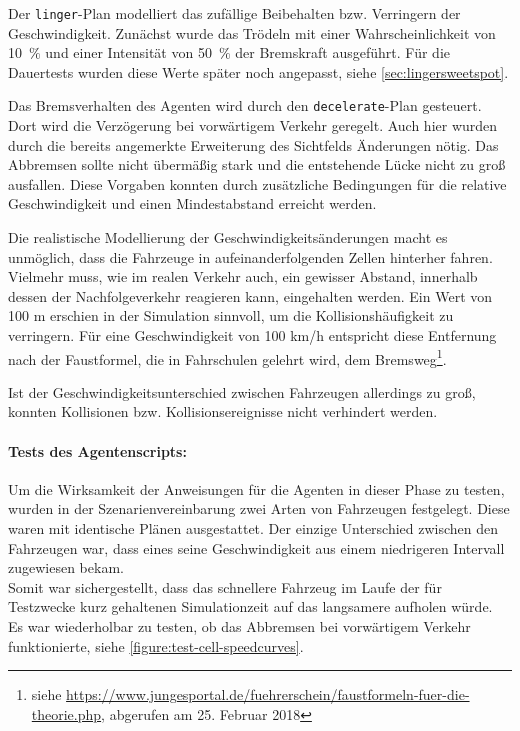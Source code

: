 Der \texttt{linger}-Plan modelliert das zufällige Beibehalten bzw. Verringern der Geschwindigkeit. 
Zunächst wurde das Trödeln mit einer Wahrscheinlichkeit von \mbox{10 $\%$} und einer Intensität von \mbox{50 $\%$} der Bremskraft ausgeführt.
Für die Dauertests wurden diese Werte später noch angepasst, siehe \cref{sec:lingersweetspot}.

Das Bremsverhalten des Agenten wird durch den \texttt{decelerate}-Plan gesteuert. 
Dort wird die Verzögerung bei vorwärtigem Verkehr geregelt.
Auch hier wurden durch die bereits angemerkte Erweiterung des Sichtfelds Änderungen nötig. 
Das Abbremsen sollte nicht übermäßig stark und die entstehende Lücke nicht zu groß ausfallen. 
Diese Vorgaben konnten durch zusätzliche Bedingungen für die relative Geschwindigkeit und einen Mindestabstand erreicht werden.

Die realistische Modellierung der Geschwindigkeitsänderungen macht es unmöglich, dass die Fahrzeuge in aufeinanderfolgenden Zellen hinterher fahren.
Vielmehr muss, wie im realen Verkehr auch, ein gewisser Abstand, innerhalb dessen der Nachfolgeverkehr reagieren kann, eingehalten werden.
Ein Wert von 100 m erschien in der Simulation sinnvoll, um die Kollisionshäufigkeit zu verringern. 
Für eine Geschwindigkeit von 100 km/h entspricht diese Entfernung nach der Faustformel, die in Fahrschulen gelehrt wird, dem Bremsweg\footnote{siehe \url{https://www.jungesportal.de/fuehrerschein/faustformeln-fuer-die-theorie.php}, abgerufen am 25. Februar 2018}.

Ist der Geschwindigkeitsunterschied zwischen Fahrzeugen allerdings zu groß, konnten Kollisionen bzw. Kollisionsereignisse nicht verhindert werden.

\paragraph*{Tests des Agentenscripts:}
Um die Wirksamkeit der Anweisungen für die Agenten in dieser Phase zu testen, wurden in der Szenarienvereinbarung zwei Arten von Fahrzeugen festgelegt.
Diese waren mit identische Plänen ausgestattet.
Der einzige Unterschied zwischen den Fahrzeugen war, dass eines seine Geschwindigkeit aus einem niedrigeren Intervall zugewiesen bekam.
\\
Somit war sichergestellt, dass das schnellere Fahrzeug im Laufe der für Testzwecke kurz gehaltenen Simulationzeit auf das langsamere aufholen würde.
Es war wiederholbar zu testen, ob das Abbremsen bei vorwärtigem Verkehr funktionierte, siehe \cref{figure:test-cell-speedcurves}.

